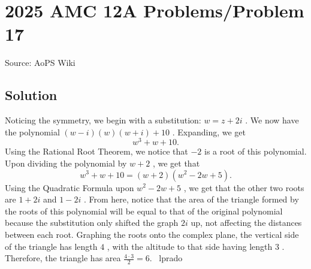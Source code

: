 \documentclass[12pt]{article}
\begin{document}
\section*{{2025 AMC 12A Problems/Problem 17}}
Source: AoPS Wiki

\subsection*{Solution}
Noticing the symmetry, we begin with a substitution: $w = z+2i$ . We now have the polynomial $(w-i)(w)(w+i)+10$ . Expanding, we get \[w^3+w+10.\] Using the Rational Root Theorem, we notice that $-2$ is a root of this polynomial. Upon dividing the polynomial by $w+2$ , we get that \[w^3+w+10 = (w+2)(w^2-2w+5).\] Using the Quadratic Formula upon $w^2-2w+5$ , we get that the other two roots are $1+2i$ and $1-2i$ . From here, notice that the area of the triangle formed by the roots of this polynomial will be equal to that of the original polynomial because the substitution only shifted the graph $2i$ up, not affecting the distances between each root. Graphing the roots onto the complex plane, the vertical side of the triangle has length $4$ , with the altitude to that side having length $3$ . Therefore, the triangle has area $\frac{4 \cdot 3}{2} = \boxed{6}.$ ~lprado
\end{document}

